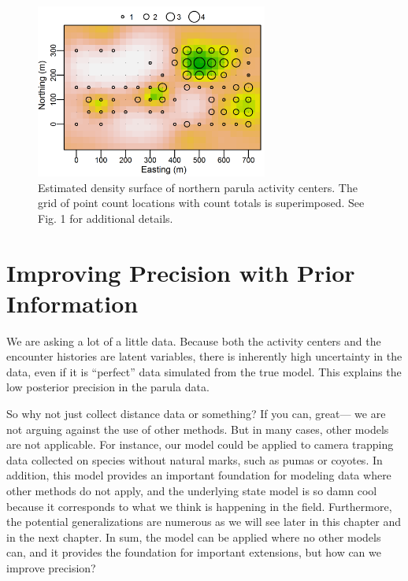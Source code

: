 \begin{figure}
  \centering
  \includegraphics[width=3in,height=2.25in]{Ch14/figs/nopaDen}
  \caption{Estimated density surface of northern parula activity
    centers. The grid of point count locations with count totals is
    superimposed. See Fig. 1 for additional details.  }
  \label{fig:nopaDen}
\end{figure}




\section{Improving Precision with Prior Information}
\label{Sect.precision}

We are asking a lot of a little data. Because both the activity
centers and the encounter histories are latent variables, there is
inherently high uncertainty in the data, even if it is ``perfect''
data simulated from the true model. This explains the low posterior
precision in the parula data.

So why not just collect distance data or something? If you can, great---
we are not arguing against the use of other methods. But in many
cases, other models are not applicable. For instance, our model could
be applied to camera trapping data collected on species without
natural marks, such as pumas or coyotes. In addition, this
model provides an important foundation for modeling data where other
methods do not apply, and the underlying state model is so damn cool
because it corresponds to what we think is happening in the field.
Furthermore, the potential generalizations are numerous as we
will see later in this chapter and in the next chapter. In sum, the
model can be applied where no other models can, and it provides the
foundation for important extensions, but how can we improve precision?

